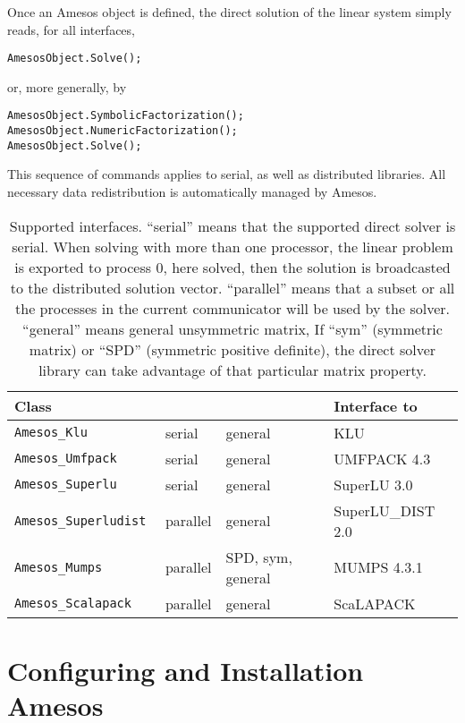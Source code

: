\documentclass[11pt]{SANDreport}
\begin{document}
Once an Amesos object is defined, the direct solution of the linear
system simply reads, for all interfaces,
\begin{verbatim}
AmesosObject.Solve();
\end{verbatim}
or, more generally, by
\begin{verbatim}
AmesosObject.SymbolicFactorization();
AmesosObject.NumericFactorization();
AmesosObject.Solve();
\end{verbatim}
This sequence of commands applies to serial, as well as distributed
libraries. All necessary data redistribution is automatically managed by
Amesos.

\begin{table}[tbhp]
  \centering
  \begin{tabular}{| l | l l l | }
    \hline
    Class &   &  & Interface to \\
    \hline
    \tt Amesos\_Klu          & serial & general & KLU \\
    \tt Amesos\_Umfpack      & serial & general & UMFPACK 4.3 \\
    \tt Amesos\_Superlu      & serial & general & SuperLU 3.0 \\
    \tt  Amesos\_Superludist  & parallel & general & SuperLU\_DIST 2.0 \\
    \tt Amesos\_Mumps        & parallel & SPD, sym, general & MUMPS 4.3.1 \\
    \tt Amesos\_Scalapack    & parallel & general & ScaLAPACK \\
    \hline
  \end{tabular}
  \caption{Supported interfaces. ``serial'' means that the supported
    direct solver is serial. When solving with 
    more than one processor, the linear problem is exported to process
    0, here solved, then the solution is broadcasted to the distributed
    solution 
    vector. ``parallel'' means that a subset or all the processes in the current
    communicator will be used by the solver. ``general'' means general
    unsymmetric 
    matrix, If ``sym'' (symmetric matrix) or  ``SPD'' (symmetric
    positive definite), the direct solver library can take advantage of
    that particular matrix property.}
  \label{tab:classes}
\end{table}



\section{Configuring and Installation Amesos}
\label{sec:3pl}
\end{document}
